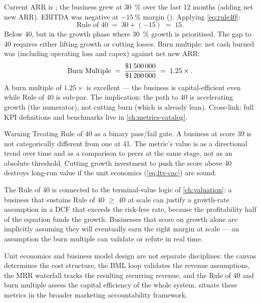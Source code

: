 \begin{example}
Current ARR is ; the business grew at \qty{30}{\percent} over the last 12 months (adding  net new ARR). EBITDA was negative at \(\qty{-15}{\percent}\) margin (). Applying \cref{eq:rule40}:
\[
  \text{Rule of 40} \;=\; 30 + (-15) \;=\; 15.
\]
Below 40, but in the growth phase where \qty{30}{\percent} growth is prioritised. The gap to 40 requires either lifting growth or cutting losses. Burn multiple: net cash burned was  (including  operating loss and  capex) against  net new ARR:
\[
  \text{Burn Multiple} \;=\; \frac{\$\num{1500000}}{\$\num{1200000}} \;=\; 1.25\times.
\]
A burn multiple of \(1.25\times\) is excellent --- the business is capital-efficient even while Rule of 40 is sub-par. The implication: the path to 40 is accelerating growth (the numerator), not cutting burn (which is already lean). Cross-link: full KPI definitions and benchmarks live in \cref{ch:metrics-catalog}.
\end{example}

\begin{admonition}{Warning}
Treating Rule of 40 as a binary pass/fail gate. A business at score 39 is not categorically different from one at 41. The metric's value is as a directional trend over time and as a comparison to peers at the same stage, not as an absolute threshold. Cutting growth investment to push the score above 40 destroys long-run value if the unit economics (\cref{eq:ltv-cac}) are sound.
\end{admonition}

The Rule of 40 is connected to the terminal-value logic of \cref{ch:valuation}: a business that sustains Rule of 40 $\ge$ 40 at scale can justify a growth-rate assumption in a DCF that exceeds the risk-free rate, because the profitability half of the equation funds the growth. Businesses that score on growth alone are implicitly assuming they will eventually earn the right margin at scale --- an assumption the burn multiple can validate or refute in real time.

Unit economics and business model design are not separate disciplines: the canvas determines the cost structure, the BML loop validates the revenue assumptions, the MRR waterfall tracks the resulting recurring revenue, and the Rule of 40 and burn multiple assess the capital efficiency of the whole system. \textcite{bendle2020marketing} situate these metrics in the broader marketing accountability framework.
